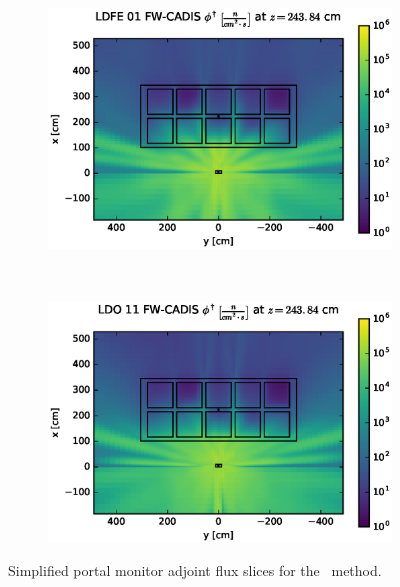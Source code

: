 \clearpage
\begin{figure}[!htb]
\ContinuedFloat
\begin{subfigure}{\textwidth}
\centering
\includegraphics[max height=0.445\textheight]
{img/cargo-plots/fwc-adj/flux-ldfe01-slice.eps}
\end{subfigure}
\\
\begin{subfigure}{\textwidth}
\centering
\includegraphics[max height=0.445\textheight]
{img/cargo-plots/fwc-adj/flux-ldo11-slice.eps}
\end{subfigure}
\caption{Simplified portal monitor adjoint flux slices for the \fwc\ method.}
\label{cargo-fwc-adj-slices}
\end{figure}

